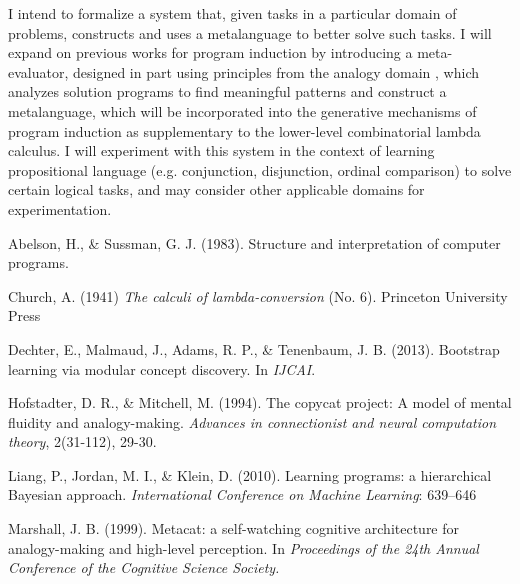\documentclass[11pt,letterpaper]{article}
\begin{document}
I intend to formalize a system that, given tasks in a particular domain of
problems, constructs and uses a metalanguage to better solve such tasks. I
will expand on previous works \cite{dechter,liang} for program induction by
introducing a meta-evaluator, designed in part using principles from
the analogy domain \cite{copycat,metacat}, which analyzes solution programs
to find meaningful patterns and construct a metalanguage, which will be
incorporated into the generative mechanisms of program induction as
supplementary to the lower-level combinatorial lambda calculus.  I will
experiment with this system in the context of learning propositional
language (e.g. conjunction, disjunction, ordinal comparison) to solve
certain logical tasks, and may consider other applicable domains for
experimentation.

\begin{thebibliography}{}

  Abelson, H., \& Sussman, G. J. (1983).
  Structure and interpretation of computer programs.

  Church, A. (1941)
  \emph{The calculi of lambda-conversion} (No. 6).
  Princeton University Press

  Dechter, E., Malmaud, J., Adams, R. P., \& Tenenbaum, J. B. (2013).
  Bootstrap learning via modular concept discovery.
  In \emph{IJCAI}.

  Hofstadter, D. R., \& Mitchell, M. (1994).
  The copycat project: A model of mental fluidity and analogy-making.
  \emph{Advances in connectionist and neural computation theory},
  2(31-112), 29-30.

  Liang, P., Jordan, M. I., \& Klein, D. (2010).
  Learning programs: a hierarchical Bayesian approach.
  \emph{International Conference on Machine Learning}: 639–646

  Marshall, J. B. (1999).
  Metacat: a self-watching cognitive architecture for analogy-making
  and high-level perception.
  In \emph{Proceedings of the 24th Annual Conference of the Cognitive
    Science Society.}

%
%
\end{thebibliography}
\end{document}
